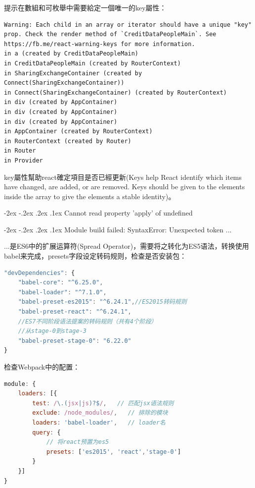 \documentclass[12pt]{book}
\makeatletter
\numberwithin{dummy}{section}
\theoremstyle{ocrenumbox}
\theoremstyle{blacknumex}
\theoremstyle{blacknumbox}
\theoremstyle{ocrenum}
\renewcommand\paragraph{\@startsection{paragraph}{4}{\z@}
	{-2ex \@plus-.2ex \@minus .2ex}
	{.1ex}
	{\normalfont\small\sffamily\bfseries}}
\makeatother
\begin{document}
提示在數組和可枚舉中需要給定一個唯一的key屬性：

\begin{lstlisting}
Warning: Each child in an array or iterator should have a unique "key" prop. Check the render method of `CreditDataPeopleMain`. See https://fb.me/react-warning-keys for more information.
in a (created by CreditDataPeopleMain)
in CreditDataPeopleMain (created by RouterContext)
in SharingExchangeContainer (created by Connect(SharingExchangeContainer))
in Connect(SharingExchangeContainer) (created by RouterContext)
in div (created by AppContainer)
in div (created by AppContainer)
in div (created by AppContainer)
in AppContainer (created by RouterContext)
in RouterContext (created by Router)
in Router
in Provider
\end{lstlisting}

key屬性幫助react確定項目是否已經更新(Keys help React identify which items have changed, are added, or are removed. Keys should be given to the elements inside the array to give the elements a stable identity)。

\paragraph{Cannot read property 'apply' of undefined}

\paragraph{Module build failed: SyntaxError: Unexpected token ...}

...是ES6中的扩展运算符(Spread Operator)，需要将之转化为ES5语法，转换使用babel来完成，presets字段设定转码规则，检查是否安装包：

\begin{lstlisting}[language=Javascript]
"devDependencies": {
	"babel-core": "^6.25.0",
	"babel-loader": "^7.1.0",
	"babel-preset-es2015": "^6.24.1",//ES2015转码规则
	"babel-preset-react": "^6.24.1",
	//ES7不同阶段语法提案的转码规则（共有4个阶段）
	//从stage-0到stage-3
	"babel-preset-stage-0": "6.22.0"
}
\end{lstlisting}

检查Webpack中的配置：

\begin{lstlisting}[language=Javascript]
module: {
	loaders: [{
		test: /\.(jsx|js)?$/,   // 匹配jsx语法规则
		exclude: /node_modules/,   // 排除的模块
		loaders: 'babel-loader',   // loader名
		query: {
			// 将react预置为es5
			presets: ['es2015', 'react','stage-0']
		}
	}]
}
\end{lstlisting}
\end{document}
